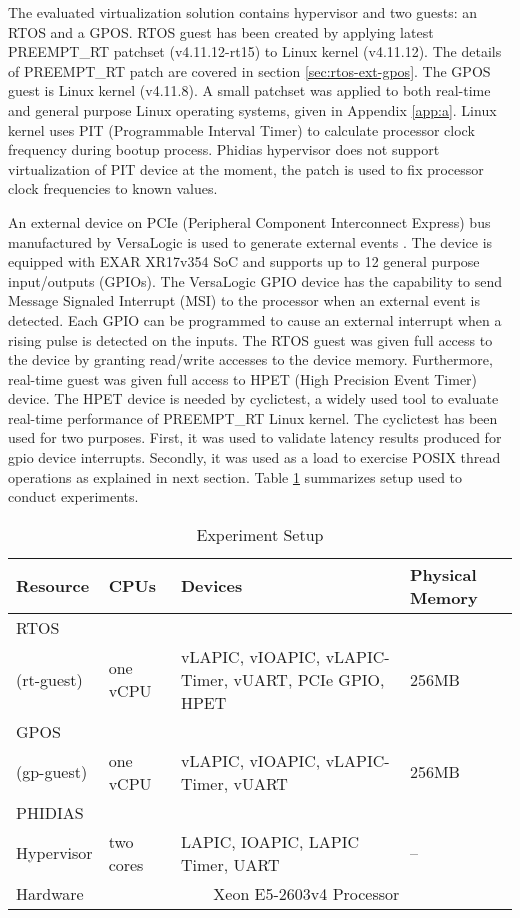 The evaluated virtualization solution contains hypervisor and two guests: an RTOS and a GPOS.
RTOS guest has been created by applying latest PREEMPT\_RT patchset (v4.11.12-rt15) to Linux kernel (v4.11.12).
The details of PREEMPT\_RT patch are covered in section \ref{sec:rtos-ext-gpos}.
The GPOS guest is Linux kernel (v4.11.8).
A small patchset was applied to both real-time and general purpose Linux operating systems, given in Appendix \ref{app:a}.
Linux kernel uses PIT (Programmable Interval Timer) to calculate processor clock frequency during bootup process.
Phidias hypervisor does not support virtualization of PIT device at the moment, the patch is used to fix processor clock frequencies to known values.


An external device on PCIe (Peripheral Component Interconnect Express) bus manufactured by VersaLogic is used to generate external events \cite{versalogic}.
The device is equipped with EXAR XR17v354 SoC \cite{xr17v354} and supports up to 12 general purpose input/outputs (GPIOs). 
The VersaLogic GPIO device has the capability to send Message Signaled Interrupt (MSI) to the processor when an external event is detected.
Each GPIO can be programmed to cause an external interrupt when a rising pulse is detected on the inputs.
The RTOS guest was given full access to the device by granting read/write accesses to the device memory.
Furthermore, real-time guest was given full access to HPET (High Precision Event Timer) device. 
The HPET device is needed by cyclictest\cite{cyclictest}, a widely used tool to evaluate real-time performance of PREEMPT\_RT Linux kernel.
The cyclictest has been used for two purposes. First, it was used to validate latency results produced for gpio device interrupts.
Secondly, it was used as a load to exercise POSIX thread operations as explained in next section.
Table \ref{experiment-setup} summarizes setup used to conduct experiments.


\begin{table}[!htbp]
\centering
\begin{tabular}{|p{2cm}|p{2cm}|p{6cm}|p{2cm}|}  
\hline
\textbf{Resource} & \textbf{CPUs} & \textbf{Devices} & \textbf{Physical Memory} \\ \hline 
RTOS & & & \\ 
(rt-guest) & one vCPU & vLAPIC, vIOAPIC, vLAPIC-Timer, vUART, PCIe GPIO, HPET & 256MB \\ \hline
GPOS & & & \\ 
(gp-guest) & one vCPU & vLAPIC, vIOAPIC, vLAPIC-Timer, vUART & 256MB \\ \hline
PHIDIAS & & & \\ 
Hypervisor & two cores & LAPIC, IOAPIC, LAPIC Timer, UART & -- \\ \hline
Hardware & \multicolumn{3}{|c|}{Xeon  E5-2603v4 Processor} \\ \hline
\end{tabular}
\caption{Experiment Setup}
\label{experiment-setup}
\end{table}

